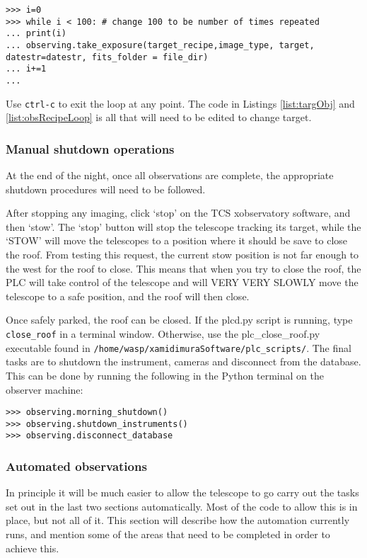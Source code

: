 \documentclass[a4paper,12pt]{article}
\begin{document}
\begin{lstlisting}[caption={Loop to repeat observing recipe.}, label={list:obsRecipeLoop}]
>>> i=0
>>> while i < 100: # change 100 to be number of times repeated
...	print(i)
...	observing.take_exposure(target_recipe,image_type, target, datestr=datestr, fits_folder = file_dir)
...	i+=1
...
\end{lstlisting}
Use {\tt ctrl-c} to exit the loop at any point. The code in Listings \ref{list:targObj} and \ref{list:obsRecipeLoop} is all that will need to be edited to change target.

\subsubsection{Manual shutdown operations}
At the end of the night, once all observations are complete, the appropriate shutdown procedures will need to be followed.

After stopping any imaging, click `stop' on the TCS xobservatory software, and then `stow'. The `stop' button will stop the telescope tracking its target, while the `STOW' will move the telescopes to a position where it should be save to close the roof. {\color{blue} From testing this request, the current stow position is not far enough to the west for the roof to close. This means that when you try to close the roof, the PLC will take control of the telescope and will VERY VERY SLOWLY move the telescope to a safe position, and the roof will then close.}

Once safely parked, the roof can be closed. If the plcd.py script is running, type {\tt close\_roof} in a terminal window. Otherwise, use the plc\_close\_roof.py executable found in {\tt /home/wasp/xamidimuraSoftware/plc\_scripts/}. The final tasks are to shutdown the instrument, cameras and disconnect from the database. This can be done by running the following in the Python terminal on the observer machine:
\begin{verbatim}
>>> observing.morning_shutdown()
>>> observing.shutdown_instruments()
>>> observing.disconnect_database
\end{verbatim}

\subsubsection{Automated observations}

In principle it will be much easier to allow the telescope to go carry out the tasks set out in the last two sections automatically. Most of the code to allow this is in place, but not all of it. This section will describe how the automation currently runs, and mention some of the areas that need to be completed in order to achieve this.
\end{document}
